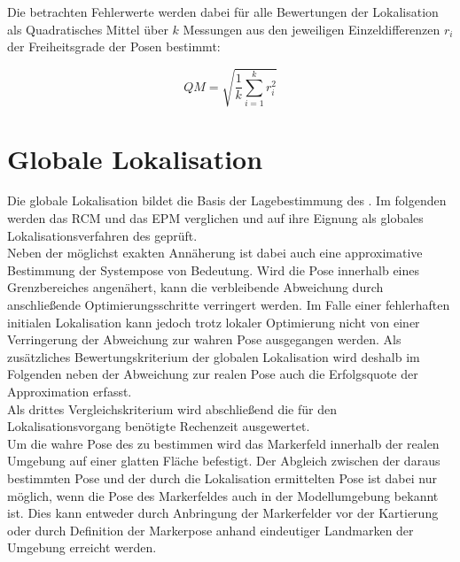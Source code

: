 Die betrachten Fehlerwerte werden dabei für alle Bewertungen der Lokalisation als Quadratisches Mittel über $k$ Messungen aus den jeweiligen Einzeldifferenzen $r_i$ der Freiheitsgrade der Posen bestimmt:

\begin{equation}
QM = \sqrt{\frac{1}{k}\sum_{i=1}^kr_i^2}
\end{equation}


\section{Globale Lokalisation}
Die globale Lokalisation bildet die Basis der Lagebestimmung des . Im folgenden werden das RCM und das EPM verglichen und auf ihre Eignung als globales Lokalisationsverfahren des  geprüft.\\
Neben der möglichst exakten Annäherung ist dabei auch eine approximative Bestimmung der Systempose von Bedeutung. Wird die Pose innerhalb eines Grenzbereiches angenähert, kann die verbleibende Abweichung durch anschließende Optimierungsschritte verringert werden. Im Falle einer fehlerhaften initialen Lokalisation kann jedoch trotz lokaler Optimierung nicht von einer Verringerung der Abweichung zur wahren Pose ausgegangen werden. Als zusätzliches Bewertungskriterium der globalen Lokalisation wird deshalb im Folgenden neben der Abweichung zur realen Pose auch die Erfolgsquote der Approximation erfasst.\\
Als drittes Vergleichskriterium wird abschließend die für den Lokalisationsvorgang benötigte Rechenzeit ausgewertet.\\


Um die wahre Pose des  zu bestimmen wird das Markerfeld innerhalb der realen Umgebung auf einer glatten Fläche befestigt. Der Abgleich zwischen der daraus bestimmten Pose und der durch die Lokalisation ermittelten Pose ist dabei nur möglich, wenn die Pose des Markerfeldes auch in der Modellumgebung bekannt ist. Dies kann entweder durch Anbringung der Markerfelder vor der Kartierung oder durch Definition der Markerpose anhand eindeutiger Landmarken der Umgebung erreicht werden.\\

